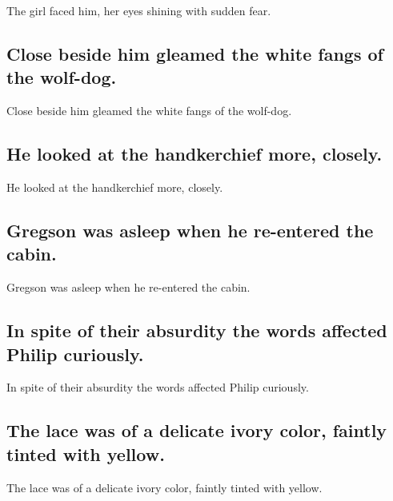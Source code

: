 \documentclass[]{article}
\begin{document}
The girl faced him, her eyes shining with sudden fear.

\hypertarget{close-beside-him-gleamed-the-white-fangs-of-the-wolf-dog.}{%
\subsection{Close beside him gleamed the white fangs of the
wolf-dog.}\label{close-beside-him-gleamed-the-white-fangs-of-the-wolf-dog.}}

Close beside him gleamed the white fangs of the wolf-dog.

\hypertarget{he-looked-at-the-handkerchief-more-closely.}{%
\subsection{He looked at the handkerchief more,
closely.}\label{he-looked-at-the-handkerchief-more-closely.}}

He looked at the handkerchief more, closely.

\hypertarget{gregson-was-asleep-when-he-re-entered-the-cabin.}{%
\subsection{Gregson was asleep when he re-entered the
cabin.}\label{gregson-was-asleep-when-he-re-entered-the-cabin.}}

Gregson was asleep when he re-entered the cabin.

\hypertarget{in-spite-of-their-absurdity-the-words-affected-philip-curiously.}{%
\subsection{In spite of their absurdity the words affected Philip
curiously.}\label{in-spite-of-their-absurdity-the-words-affected-philip-curiously.}}

In spite of their absurdity the words affected Philip curiously.

\hypertarget{the-lace-was-of-a-delicate-ivory-color-faintly-tinted-with-yellow.}{%
\subsection{The lace was of a delicate ivory color, faintly tinted with
yellow.}\label{the-lace-was-of-a-delicate-ivory-color-faintly-tinted-with-yellow.}}

The lace was of a delicate ivory color, faintly tinted with yellow.
\end{document}
